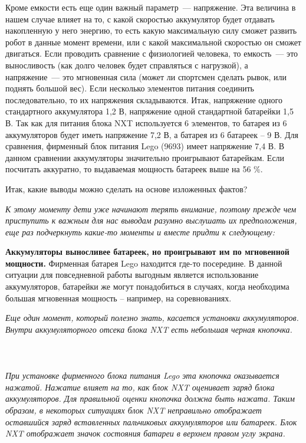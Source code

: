 Кроме емкости есть еще один важный параметр~--- напряжение. Эта величина в нашем случае влияет на то, с какой скоростью аккумулятор будет отдавать накопленную у него энергию, то есть какую максимальную силу сможет развить робот в данные момент времени, или с какой максимальной скоростью он сможет двигаться. Если проводить сравнение с физиологией человека, то емкость~--- это выносливость (как долго человек будет справляться с нагрузкой), а напряжение~--- это мгновенная сила (может ли спортсмен сделать рывок, или поднять большой вес). Если несколько элементов питания соединить последовательно, то их напряжения складываются. Итак, напряжение одного стандартного аккумулятора 1,2 В, напряжение одной стандартной батарейки 1,5 В. Так как для питания блока NXT используется 6 элементов, то батарея из 6 аккумуляторов будет иметь напряжение 7,2 В, а батарея из 6 батареек – 9 В. Для сравнения, фирменный блок питания Lego (9693) имеет напряжение 7,4 В. В данном сравнении аккумуляторы значительно проигрывают батарейкам. Если посчитать аккуратно, то выдаваемая мощность батареек выше на 56 \%. 

Итак, какие выводы можно сделать на основе изложенных фактов?

{\slshape К этому моменту дети уже начинают терять внимание, поэтому прежде чем приступить к важным для нас выводам разумно выслушать их предположения, еще раз подчеркнуть какие-то моменты и вместе придти к следующему:}

{\bfseries Аккумуляторы выносливее батареек, но проигрывают им по мгновенной мощности.} Фирменная батарея Lego находится где-то посередине. В данной ситуации для повседневной работы выгодным является использование аккумуляторов,  батарейки же могут понадобиться в случаях, когда необходима большая мгновенная мощность – например, на соревнованиях.

{\slshape Еще один момент, который полезно знать, касается установки аккумуляторов. Внутри аккумуляторного отсека блока NXT есть небольшая черная кнопочка.}\\\\
\\\\

{\slshape При установке фирменного блока питания Lego эта кнопочка оказывается нажатой. Нажатие влияет на то, как блок NXT оценивает заряд блока аккумуляторов. Для правильной оценки кнопочка должна быть нажата. Таким образом, в некоторых ситуациях блок NXT неправильно отображает оставшийся заряд вставленных пальчиковых аккумуляторов или батареек. Блок NXT отображает значок состояния батареи в верхнем правом углу экрана.}\\\\
\\\\

